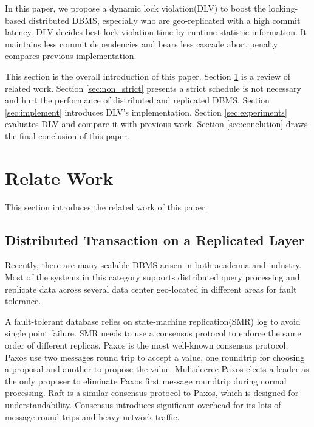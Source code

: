 \documentclass[conference]{IEEEtran}
\begin{document}
In this paper, we propose a dynamic lock violation(DLV) to boost the locking-based distributed DBMS, especially who are geo-replicated with a high commit latency.
DLV decides best lock violation time by runtime statistic information.
It maintains less commit dependencies and bears less cascade abort penalty compares previous implementation\cite{CLV:conf/sigmod/GraefeLKTV13}. 

This section is the overall introduction of this paper.
Section \ref{sec:relate_work} is a review of related work.
Section \ref{sec:non_strict} presents a strict schedule is not necessary and hurt the performance of distributed and replicated DBMS.
Section \ref{sec:implement} introduces DLV's implementation.
Section \ref{sec:experiments} evaluates DLV and compare it with previous work.
Section \ref{sec:conclution} draws the final conclusion of this paper.


\section{Relate Work}
\label{sec:relate_work}
This section introduces the related work of this paper.

\subsection{Distributed Transaction on a Replicated Layer}
Recently, there are many scalable DBMS arisen in both academia and industry.
Most of the systems in this category supports distributed query processing and
replicate data across several data center geo-located in different areas for fault tolerance.

A fault-tolerant database relies on state-machine replication(SMR) log to avoid single point failure.
SMR needs to use a consensus protocol to enforce the same order of different replicas.
Paxos\cite{Paxos:journals/tocs/Lamport98}\cite{PaxosSimple:conf/opodis/Lamport02} is the most well-known consensus protocol.
Paxos use two messages round trip to accept a value, one roundtrip for choosing a proposal and another to propose the value.
Multidecree Paxos\cite{Multidecree:journals/csur/RenesseA15} elects a leader as the only proposer to eliminate Paxos first message roundtrip during normal processing.
Raft\cite{Raft:conf/usenix/OngaroO14} is a similar consensus protocol to Paxos, which is designed for understandability.
Consensus introduces significant overhead for its lots of message round trips and heavy network traffic.
\end{document}
